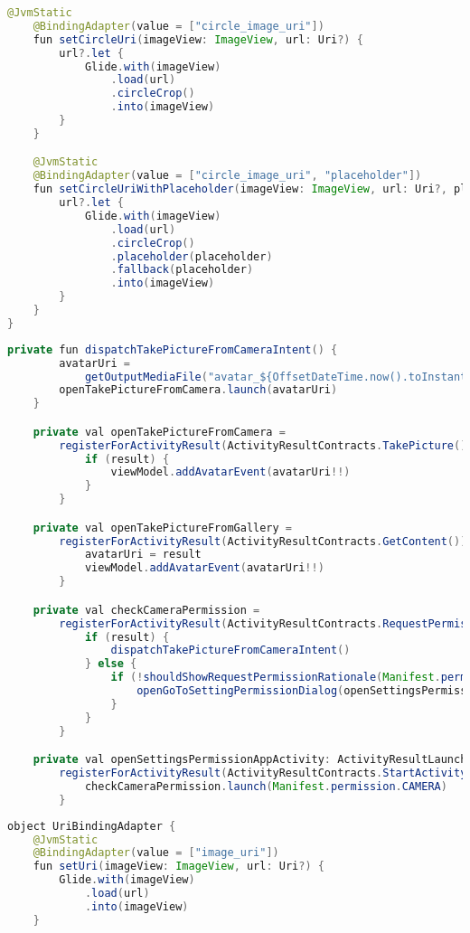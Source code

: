 \begin{asection}
\begin{lstlisting}[language=Java,label={lst:add:a_8}, caption={UriBindingAdapter}]
    @JvmStatic
    @BindingAdapter(value = ["circle_image_uri"])
    fun setCircleUri(imageView: ImageView, url: Uri?) {
        url?.let {
            Glide.with(imageView)
                .load(url)
                .circleCrop()
                .into(imageView)
        }
    }

    @JvmStatic
    @BindingAdapter(value = ["circle_image_uri", "placeholder"])
    fun setCircleUriWithPlaceholder(imageView: ImageView, url: Uri?, placeholder: Drawable) {
        url?.let {
            Glide.with(imageView)
                .load(url)
                .circleCrop()
                .placeholder(placeholder)
                .fallback(placeholder)
                .into(imageView)
        }
    }
}
\end{lstlisting}
\begin{lstlisting}[language=Java,label={lst:add:a_11}, caption={Методы для взаимодействия с камерой}]
private fun dispatchTakePictureFromCameraIntent() {
        avatarUri =
            getOutputMediaFile("avatar_${OffsetDateTime.now().toInstant().toEpochMilli()}.jpg")
        openTakePictureFromCamera.launch(avatarUri)
    }

    private val openTakePictureFromCamera =
        registerForActivityResult(ActivityResultContracts.TakePicture()) { result ->
            if (result) {
                viewModel.addAvatarEvent(avatarUri!!)
            }
        }

    private val openTakePictureFromGallery =
        registerForActivityResult(ActivityResultContracts.GetContent()) { result ->
            avatarUri = result
            viewModel.addAvatarEvent(avatarUri!!)
        }

    private val checkCameraPermission =
        registerForActivityResult(ActivityResultContracts.RequestPermission()) { result ->
            if (result) {
                dispatchTakePictureFromCameraIntent()
            } else {
                if (!shouldShowRequestPermissionRationale(Manifest.permission.CAMERA)) {
                    openGoToSettingPermissionDialog(openSettingsPermissionAppActivity)
                }
            }
        }

    private val openSettingsPermissionAppActivity: ActivityResultLauncher<Intent> =
        registerForActivityResult(ActivityResultContracts.StartActivityForResult()) {
            checkCameraPermission.launch(Manifest.permission.CAMERA)
        }
\end{lstlisting}
\begin{lstlisting}[language=Java,label={lst:add:a_9}, caption={AhriMessagingService}, caption={PreferenceDataSource}]
object UriBindingAdapter {
    @JvmStatic
    @BindingAdapter(value = ["image_uri"])
    fun setUri(imageView: ImageView, url: Uri?) {
        Glide.with(imageView)
            .load(url)
            .into(imageView)
    }


\end{lstlisting}
\end{asection}
